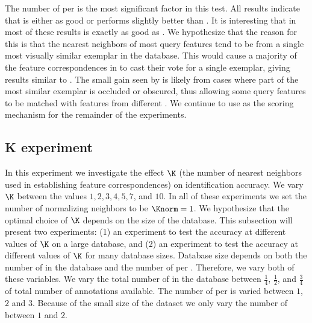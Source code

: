         The number of \exemplars{} per \name{} is the most significant factor in this test.
        All results indicate that \nsum{} is either as good or performs slightly better than \csum{}.
        It is interesting that in most of these results \nsum{} is exactly as good as \csum{}.
        We hypothesize that the reason for this is that the nearest neighbors of most query features tend to be
          from a single most visually similar exemplar in the database.
        This would cause a majority of the feature correspondences in \nsum{} to cast their vote for a single
          exemplar, giving results similar to \csum{}.
        The small gain seen by \nsum{} is likely from cases where part of the most similar exemplar is occluded
          or obscured, thus allowing some query features to be matched with features from different \exemplars{}.
        We continue to use \nsum{} as the scoring mechanism for the remainder of the experiments.
        

    \subsection{K experiment}\label{sub:exptk}  

        In this experiment we investigate the effect $\K$ (the number of nearest neighbors used in establishing
          feature correspondences) on identification accuracy.
        We vary $\K$ between the values $1, 2, 3, 4, 5, 7$, and $10$.
        In all of these experiments we set the number of normalizing neighbors to be $\Knorm=1$.
        We hypothesize that the optimal choice of $\K$ depends on the size of the database.
        This subsection will present two experiments:
        (1) an experiment to test the accuracy at different values of $\K$ on a large database, and
        (2) an experiment to test the accuracy at different values of $\K$ for many database sizes.
        Database size depends on both the number of \names{} in the database and the number of \exemplars{} per
          \name{}.
        Therefore, we vary both of these variables.
        We vary the total number of \exemplars{} in the database between $\frac{1}{4}$, $\frac{1}{2}$, and
          $\frac{3}{4}$ of total number of annotations available.
        The number of \exemplars{} per \name{} is varied between $1$, $2$ and $3$.
        Because of the small size of the \girmmasterI{} dataset we only vary the number of \exemplars{} between
          $1$ and $2$.

